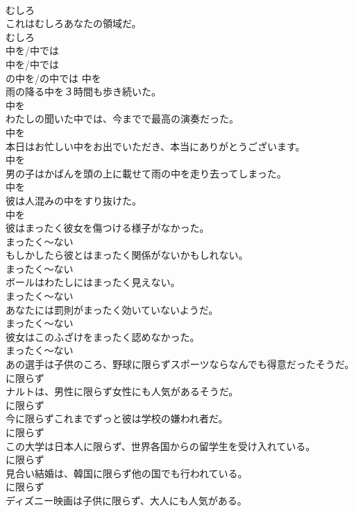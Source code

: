 \documentclass[8pt]{extreport}
\begin{document}
\begin{CJK}{UTF8}{min}
\\	むしろ
\\	これはむしろあなたの領域だ。	
\\	むしろ
\\	中を/中では	
\\	中を/中では	
\\	の中を/の中では	中を
\\	雨の降る中を３時間も歩き続いた。	
\\	中を
\\	わたしの聞いた中では、今までで最高の演奏だった。	
\\	中を
\\	本日はお忙しい中をお出でいただき、本当にありがとうございます。	
\\	中を
\\	男の子はかばんを頭の上に載せて雨の中を走り去ってしまった。	
\\	中を
\\	彼は人混みの中をすり抜けた。	
\\	中を
\\	彼はまったく彼女を傷つける様子がなかった。	
\\	まったく～ない
\\	もしかしたら彼とはまったく関係がないかもしれない。	
\\	まったく～ない
\\	ボールはわたしにはまったく見えない。	
\\	まったく～ない
\\	あなたには罰則がまったく効いていないようだ。	
\\	まったく～ない
\\	彼女はこのふざけをまったく認めなかった。	
\\	まったく～ない
\\	あの選手は子供のころ、野球に限らずスポーツならなんでも得意だったそうだ。	
\\	に限らず
\\	ナルトは、男性に限らず女性にも人気があるそうだ。	
\\	に限らず
\\	今に限らずこれまでずっと彼は学校の嫌われ者だ。	
\\	に限らず
\\	この大学は日本人に限らず、世界各国からの留学生を受け入れている。	
\\	に限らず
\\	見合い結婚は、韓国に限らず他の国でも行われている。	
\\	に限らず
\\	ディズニー映画は子供に限らず、大人にも人気がある。	

\end{CJK}
\end{document}
